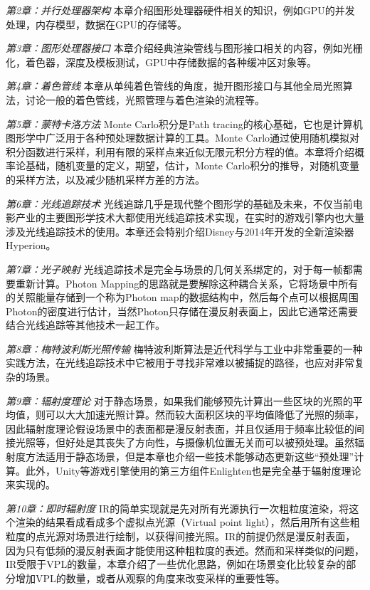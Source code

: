 \emph{第2章：并行处理器架构 } 本章介绍图形处理器硬件相关的知识，例如GPU的并发处理，内存模型，数据在GPU的存储等。

\emph{第3章：图形处理器接口 } 本章介绍经典渲染管线与图形接口相关的内容，例如光栅化，着色器，深度及模板测试，GPU中存储数据的各种缓冲区对象等。

\emph{第4章：着色管线 } 本章从单纯着色管线的角度，抛开图形接口与其他全局光照算法，讨论一般的着色管线，光照管理与着色渲染的流程等。

\emph{第5章：蒙特卡洛方法 } Monte Carlo积分是Path tracing的核心基础，它也是计算机图形学中广泛用于各种预处理数据计算的工具。Monte Carlo通过使用随机模拟对积分函数进行采样，利用有限的采样点来近似无限元积分方程的值。本章将介绍概率论基础，随机变量的定义，期望，估计，Monte Carlo积分的推导，对随机变量的采样方法，以及减少随机采样方差的方法。

\emph{第6章：光线追踪技术 } 光线追踪几乎是现代整个图形学的基础及未来，不仅当前电影产业的主要图形学技术大都使用光线追踪技术实现，在实时的游戏引擎内也大量涉及光线追踪技术的使用。本章还会特别介绍Disney与2014年开发的全新渲染器Hyperion。

\emph{第7章：光子映射 } 光线追踪技术是完全与场景的几何关系绑定的，对于每一帧都需要重新计算。Photon Mapping的思路就是要解除这种耦合关系，它将场景中所有的关照能量存储到一个称为Photon map的数据结构中，然后每个点可以根据周围Photon的密度进行估计，当然Photon只存储在漫反射表面上，因此它通常还需要结合光线追踪等其他技术一起工作。

\emph{第8章：梅特波利斯光照传输 } 梅特波利斯算法是近代科学与工业中非常重要的一种实践方法，在光线追踪技术中它被用于寻找非常难以被捕捉的路径，也应对非常复杂的场景。


\emph{第9章：辐射度理论 } 对于静态场景，如果我们能够预先计算出一些区块的光照的平均值，则可以大大加速光照计算。然而较大面积区块的平均值降低了光照的频率，因此辐射度理论假设场景中的表面都是漫反射表面，并且仅适用于频率比较低的间接光照等，但好处是其丧失了方向性，与摄像机位置无关而可以被预处理。虽然辐射度方法适用于静态场景，但是本章也介绍一些技术能够动态更新这些“预处理”计算。此外，Unity等游戏引擎使用的第三方组件Enlighten也是完全基于辐射度理论来实现的。


\emph{第10章：即时辐射度 } IR的简单实现就是先对所有光源执行一次粗粒度渲染，将这个渲染的结果看成看成多个虚拟点光源（Virtual point light），然后用所有这些粗粒度的点光源对场景进行绘制，以获得间接光照。IR的前提仍然是漫反射表面，因为只有低频的漫反射表面才能使用这种粗粒度的表述。然而和采样类似的问题，IR受限于VPL的数量，本章介绍了一些优化思路，例如在场景变化比较复杂的部分增加VPL的数量，或者从观察的角度来改变采样的重要性等。



